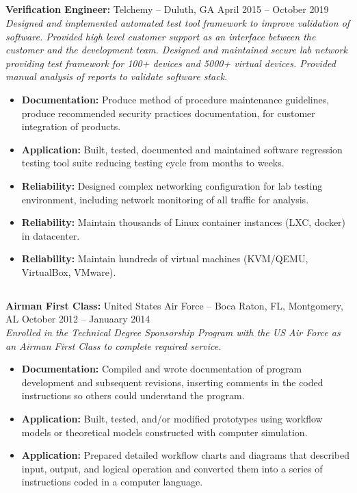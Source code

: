 \documentclass[11pt]{article}       %
\begin{document}
\subsection*{}
\textbf{Verification Engineer:} {Telchemy} -- Duluth, GA \hfill April 2015 -- October 2019 \\
\vspace{4pt}
\textit{Designed and implemented automated test tool framework to improve validation of software. Provided high level customer support as an interface between the customer and the development team. Designed and maintained secure lab network providing test framework for 100+ devices and 5000+ virtual devices. Provided manual analysis of reports to validate software stack.} \\
\vspace{-6.5pt}
\begin{itemize}
  \item \textbf{Documentation:} Produce method of procedure maintenance guidelines, produce recommended security practices documentation, for customer integration of products.
  \item \textbf{Application:} Built, tested, documented and maintained software regression testing tool suite reducing testing cycle from months to weeks. 
  \item \textbf{Reliability:} Designed complex networking configuration for lab testing environment, including network monitoring of all traffic for analysis.
  \item \textbf{Reliability:} Maintain thousands of Linux container instances (LXC, docker) in datacenter.
  \item \textbf{Reliability:} Maintain hundreds of virtual machines (KVM/QEMU, VirtualBox, VMware).
\end{itemize}

\subsection*{}
\textbf{Airman First Class:} {United States Air Force} -- Boca Raton, FL, Montgomery, AL \hfill October 2012 -- Januaary 2014 \\
\vspace{4pt}
\textit{Enrolled in the Technical Degree Sponsorship Program with the US Air Force as an Airman First Class to complete required service.} \\
\vspace{-6.5pt}
\begin{itemize}
  \item \textbf{Documentation:} Compiled and wrote documentation of program development and subsequent revisions, inserting comments in the coded instructions so others could understand the program.
  \item \textbf{Application:} Built, tested, and/or modified prototypes using workflow models or theoretical models constructed with computer simulation.
  \item \textbf{Application:} Prepared detailed workflow charts and diagrams that described input, output, and logical operation and converted them into a series of instructions coded in a computer language.
\end{itemize}
\end{document}
